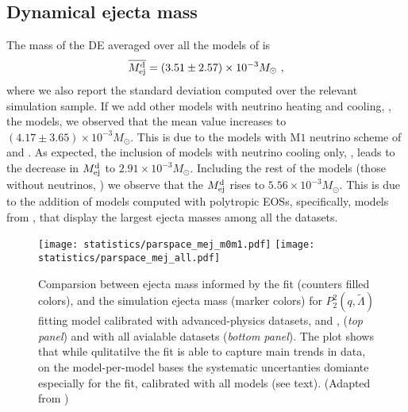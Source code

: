 
\subsection{Dynamical ejecta mass}

The mass of the \ac{DE} averaged over all the models of \DSrefset{} is 
%
\begin{equation}
\label{eq:ejecta:dyn:avg:M}
\overline{M^{\text{d}}_{\text{ej}}} = (3.51 \pm 2.57)\times 10^{-3}M_{\odot}\ ,
\end{equation}
%
where we also report the standard deviation computed over the relevant simulation sample.
If we add other models with neutrino heating and cooling, \ie, the \DSheatcool{} models,
we observed that the mean value increases to $(4.17 \pm 3.65)\times 10^{-3}M_{\odot}$.
This is due to the models with M$1$ neutrino scheme of \citet{Vincent:2019kor} and 
\citet{Sekiguchi:2016bjd}.
%
As expected, the inclusion of models with neutrino cooling only, \DScool{}, 
leads to the decrease in $M^{\text{d}}_{\text{ej}}$ to $2.91\times 10^{-3}M_{\odot}$.
%
Including the rest of the models (those without neutrinos, \DSnone{}) we observe 
that the $M^{\text{d}}_{\text{ej}}$ rises to $5.56\times 10^{-3}M_{\odot}$. This is due to the addition 
of models computed with polytropic \acp{EOS}, specifically, models from 
\citet{Dietrich:2016hky}, that display the largest ejecta masses among all the datasets.
%
\begin{figure}[t]
    \centering 
    \texttt{[image: statistics/parspace\_mej\_m0m1.pdf]}
    \texttt{[image: statistics/parspace\_mej\_all.pdf]}
    \caption{
        Comparsion between ejecta mass informed by the fit (counters filled colors), 
        and the simulation ejecta mass (marker colors) for $P_2^2(q,\tilde{\Lambda})$ 
        fitting model calibrated with advanced-physics datasets, 
        \DSrefset{} and \DSheatcool{}, (\textit{top panel}) and with all 
        avialable datasets (\textit{bottom panel}).
        The plot shows that while qulitatilve the fit is able to capture main trends 
        in data, on the model-per-model bases the systematic uncertanties domiante 
        especially for the fit, calibrated with all models (see text).
        (Adapted from \citet{Nedora:2020qtd})
    }
    \label{fig:mej_parspace}
\end{figure}


